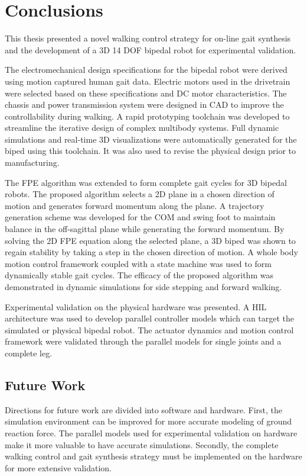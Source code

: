\chapter{Conclusions} %
\label{cha:conclusion}

This thesis presented a novel walking control strategy for on-line gait synthesis and the development of a 3D 14 DOF bipedal robot for experimental validation. 

The electromechanical design specifications for the bipedal robot were  derived using motion captured human gait data. Electric motors used in the drivetrain were selected based on these specifications and DC motor characteristics. The chassis and power transmission system were designed in CAD to improve the controllability during walking. A rapid prototyping toolchain was developed to streamline the iterative design of complex multibody systems. Full dynamic simulations and real-time 3D visualizations were automatically generated for the biped using this toolchain. It was also used to revise the physical design prior to manufacturing. 

The FPE algorithm was extended to form complete gait cycles for 3D bipedal robots. The proposed algorithm selects a 2D plane in a chosen direction of motion and generates forward momentum along the plane. A trajectory generation scheme was developed for the COM and swing foot to maintain balance in the off-sagittal plane while generating the forward momentum. By solving the 2D FPE equation along the selected plane, a 3D biped was shown to regain stability by taking a step in the chosen direction of motion. A whole body motion control framework coupled with a state machine was used to form dynamically stable gait cycles. The efficacy of the proposed algorithm was demonstrated in dynamic simulations for side stepping and forward walking. 

Experimental validation on the physical hardware was presented. A HIL architecture was used to develop parallel controller models which can target the simulated or physical bipedal robot. The actuator dynamics and motion control framework were validated through the parallel models for single joints and a complete leg.  

\section{Future Work} %
\label{sec:future_work}
Directions for future work are divided into software and hardware. First, the simulation environment can be improved for more accurate modeling of ground reaction force. The parallel models used for experimental validation on hardware make it more valuable to have accurate simulations. Secondly, the complete walking control and gait synthesis strategy must be implemented on the hardware for more extensive validation. 

